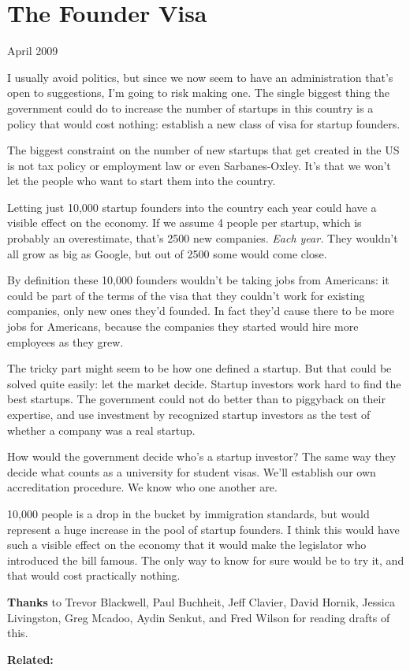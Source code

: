 \chapter{The Founder Visa}

April 2009

I usually avoid politics, but since we now seem to have an
administration that's open to suggestions, I'm going to risk making one.
The single biggest thing the government could do to increase the number
of startups in this country is a policy that would cost nothing:
establish a new class of visa for startup founders.

The biggest constraint on the number of new startups that get created in
the US is not tax policy or employment law or even Sarbanes-Oxley. It's
that we won't let the people who want to start them into the country.

Letting just 10,000 startup founders into the country each year could
have a visible effect on the economy. If we assume 4 people per startup,
which is probably an overestimate, that's 2500 new companies. \emph{Each
year.} They wouldn't all grow as big as Google, but out of 2500 some
would come close.

By definition these 10,000 founders wouldn't be taking jobs from
Americans: it could be part of the terms of the visa that they couldn't
work for existing companies, only new ones they'd founded. In fact
they'd cause there to be more jobs for Americans, because the companies
they started would hire more employees as they grew.

The tricky part might seem to be how one defined a startup. But that
could be solved quite easily: let the market decide. Startup investors
work hard to find the best startups. The government could not do better
than to piggyback on their expertise, and use investment by recognized
startup investors as the test of whether a company was a real startup.

How would the government decide who's a startup investor? The same way
they decide what counts as a university for student visas. We'll
establish our own accreditation procedure. We know who one another are.

10,000 people is a drop in the bucket by immigration standards, but
would represent a huge increase in the pool of startup founders. I think
this would have such a visible effect on the economy that it would make
the legislator who introduced the bill famous. The only way to know for
sure would be to try it, and that would cost practically nothing.

\textbf{Thanks} to Trevor Blackwell, Paul Buchheit, Jeff Clavier, David
Hornik, Jessica Livingston, Greg Mcadoo, Aydin Senkut, and Fred Wilson
for reading drafts of this.

\textbf{Related:}